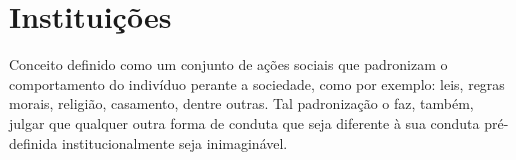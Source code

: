 \documentclass[
	12pt,				%
	openany,
	oneside,			%
	a4paper,			%
	chapter=TITLE,		%
	english,			%
	brazil				%
]{abntex2}
\begin{document}
\chapter{Instituições}
Conceito definido como um conjunto de ações sociais que padronizam o comportamento do indivíduo perante a sociedade, como por exemplo: leis, regras morais, religião, casamento, dentre outras. Tal padronização o faz, também, julgar que qualquer outra forma de conduta que seja diferente à sua conduta pré-definida institucionalmente seja inimaginável.


\postextual


\end{document}
